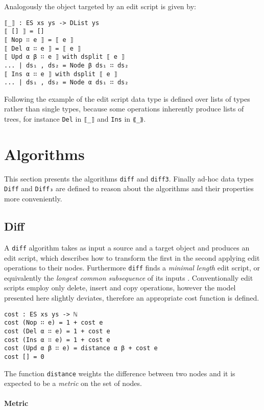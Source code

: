 \documentclass[../Thesis.tex]{subfiles}
\begin{document}
Analogously the object targeted by an edit script is given by:

\begin{verbatim}
⟦_⟧ : ES xs ys -> DList ys
⟦ [] ⟧ = []
⟦ Nop ∷ e ⟧ = ⟦ e ⟧
⟦ Del α ∷ e ⟧ = ⟦ e ⟧
⟦ Upd α β ∷ e ⟧ with dsplit ⟦ e ⟧
... | ds₁ , ds₂ = Node β ds₁ ∷ ds₂
⟦ Ins α ∷ e ⟧ with dsplit ⟦ e ⟧
... | ds₁ , ds₂ = Node α ds₁ ∷ ds₂
\end{verbatim}

Following the example of \cite{Lemp09} the edit script
data type is defined over lists of types rather than single types, because 
some operations inherently produce lists of trees, for instance \texttt{Del} in \texttt{⟦\_⟧} and \texttt{Ins} in \texttt{⟪\_⟫}.

\section{Algorithms}
This section presents the algorithms \texttt{diff} and \texttt{diff3}.
Finally ad-hoc data types \texttt{Diff} and \texttt{Diff₃} are defined to
reason about the algorithms and their properties more conveniently.

	\subsection{Diff}
	A \texttt{diff} algorithm takes as input a source and a target object
	and produces an edit script, which describes how to transform the first
	in the second applying edit operations to their nodes.
	Furthermore \texttt{diff} finds a \emph{minimal length} edit script, or
	equivalently the \emph{longest common subsequence} of its inputs
	\cite{Berg00, PierceDiff3}. %
	Conventionally edit scripts employ only delete, insert and copy operations,
	however the model presented here slightly deviates, therefore an 
	appropriate cost function is defined.
	
\begin{verbatim}
cost : ES xs ys -> ℕ
cost (Nop ∷ e) = 1 + cost e
cost (Del α ∷ e) = 1 + cost e
cost (Ins α ∷ e) = 1 + cost e
cost (Upd α β ∷ e) = distance α β + cost e 
cost [] = 0
\end{verbatim}

	The function \texttt{distance} weights the difference between two nodes 
	and it is expected to be a \emph{metric} on the set of nodes.

	\paragraph{Metric}
	
\end{document}
